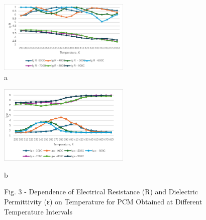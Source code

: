 \begin{figure}[H]
  \centering
  \includegraphics[width=0.56\textwidth]{assets/1098}
	\caption*{a}
\end{figure}

\begin{figure}[H]
  \centering
  \includegraphics[width=0.56\textwidth]{assets/1097}
	\caption*{b}
	\caption*{Fig. 3 - Dependence of Electrical Resistance (R) and Dielectric Permittivity (ε) on Temperature for PCM Obtained at Different Temperature Intervals}
\end{figure}

